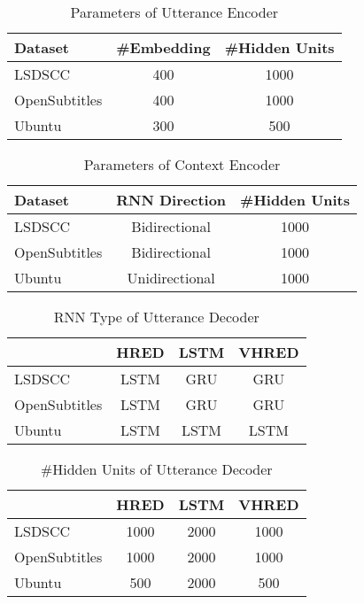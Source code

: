 \begin{table}[h]
    \centering
    \caption{Parameters of Utterance Encoder}
    \label{tab:ParametersOfUtteranceEncoder}
    \begin{tabular}{|l|c|c|}
        \hline
        Dataset & {\#Embedding} & {\#Hidden Units} \\
        \hline
        LSDSCC & 400 & 1000 \\
        \hline
        OpenSubtitles & 400 & 1000 \\
        \hline
        Ubuntu & 300 & 500 \\
        \hline
    \end{tabular}
\end{table}

\begin{table}[h]
    \centering
    \caption{Parameters of Context Encoder}
    \label{tab:ParametersOfContextEncoder}
    \begin{tabular}{|l|c|c|}
        \hline
        Dataset & RNN Direction & \#Hidden Units \\
        \hline
        LSDSCC & Bidirectional & 1000 \\
        \hline
        OpenSubtitles & Bidirectional & 1000 \\
        \hline
        Ubuntu & Unidirectional & 1000 \\
        \hline
    \end{tabular}
\end{table}

\begin{table}[h]
    \centering
    \caption{RNN Type of Utterance Decoder}
    \label{tab:RNNTypeOfUtteranceDecoder}
    \begin{tabular}{|l|*{3}{c|}}
        \hline
        & HRED & LSTM & VHRED \\
        \hline
        LSDSCC & LSTM & GRU & GRU \\
        \hline
        OpenSubtitles & LSTM & GRU & GRU \\
        \hline
        Ubuntu & LSTM & LSTM & LSTM \\
        \hline
    \end{tabular}
\end{table}

\begin{table}[h]
    \centering
    \caption{\#Hidden Units of Utterance Decoder}
    \label{tab:HiddenUnitsOfUtteranceDecoder}
    \begin{tabular}{|l|*{3}{c|}}
        \hline
        & HRED & LSTM & VHRED \\
        \hline
        LSDSCC & 1000 & 2000 & 1000 \\
        \hline
        OpenSubtitles & 1000 & 2000 & 1000 \\
        \hline
        Ubuntu & 500 & 2000 & 500 \\
        \hline
    \end{tabular}
\end{table}
